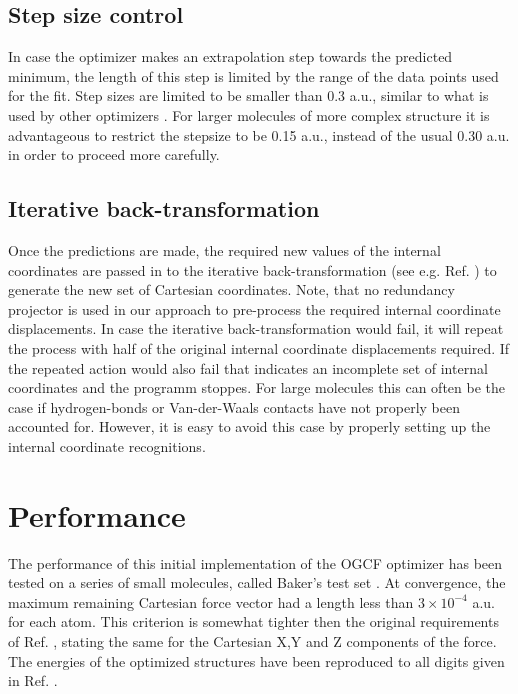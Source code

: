 \documentclass[prl,aps,twocolumn,showpacs,twocolumngrid,superbib]{revtex4}
\begin{document}
\subsection{Step size control}
In case the optimizer makes an extrapolation step towards the predicted
minimum, the length of this step is limited by the range of the
data points used for the fit. Step sizes are limited to be smaller
than 0.3 a.u., similar to what is used by other optimizers 
\cite{eckert}.
For larger molecules of more complex structure 
it is advantageous to restrict
the stepsize to be 0.15 a.u., instead of the usual 0.30 a.u. 
in order to proceed more carefully.

\subsection{Iterative back-transformation}
Once the predictions are made, the required new values of the internal
coordinates are passed in to the iterative back-transformation
(see e.g. Ref. \cite{nemeth_coordtrf1})
to generate the new set of Cartesian coordinates. Note, that no
redundancy projector is used in our approach to pre-process the
required internal coordinate displacements. In case the iterative 
back-transformation would fail, it will repeat the process with 
half of the original
internal coordinate displacements required. If the repeated action 
would also fail that indicates an incomplete set of internal coordinates
and the programm stoppes. For large molecules this can often be the case
if hydrogen-bonds or Van-der-Waals contacts have not properly been 
accounted for. However, it is easy to avoid this case by properly 
setting up the internal coordinate recognitions.

\section{Performance}
The performance of this initial implementation of the OGCF optimizer
has been tested on a 
series of small molecules, called Baker's test set \cite{bakerstest}.
At convergence, the maximum remaining Cartesian
force vector had a length less than $3\times10^{-4}$ a.u. for each
atom. This criterion is somewhat tighter then the original requirements
of Ref. \cite{bakerstest}, stating the same for the Cartesian X,Y and Z
components of the force. The energies of the optimized
structures have been reproduced to all digits given in 
Ref. \cite{bakerstest}.
\end{document}
